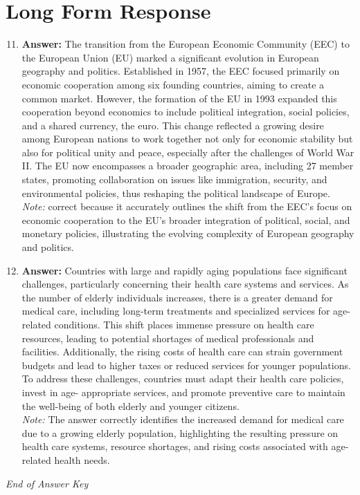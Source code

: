 \documentclass[12pt]{article}
\begin{document}
\section*{Long Form Response}
\begin{enumerate}[label=\arabic*.]
\setcounter{enumi}{10}
\item \textbf{Answer:} The transition from the European Economic Community (EEC) to the European Union (EU) marked a significant evolution in European geography and politics. Established in 1957, the EEC focused primarily on economic cooperation among six founding countries, aiming to create a common market. However, the formation of the EU in 1993 expanded this cooperation beyond economics to include political integration, social policies, and a shared currency, the euro. This change reflected a growing desire among European nations to work together not only for economic stability but also for political unity and peace, especially after the challenges of World War II. The EU now encompasses a broader geographic area, including 27 member states, promoting collaboration on issues like immigration, security, and environmental policies, thus reshaping the political landscape of Europe.
\\ \textit{Note:} correct because it accurately outlines the shift from the EEC's focus on economic cooperation to the EU's broader integration of political, social, and monetary policies, illustrating the evolving complexity of European geography and politics.
\item \textbf{Answer:} Countries with large and rapidly aging populations face significant challenges, particularly concerning their health care systems and services. As the number of elderly individuals increases, there is a greater demand for medical care, including long-term treatments and specialized services for age-related conditions. This shift places immense pressure on health care resources, leading to potential shortages of medical professionals and facilities. Additionally, the rising costs of health care can strain government budgets and lead to higher taxes or reduced services for younger populations. To address these challenges, countries must adapt their health care policies, invest in age- appropriate services, and promote preventive care to maintain the well-being of both elderly and younger citizens.
\\ \textit{Note:} The answer correctly identifies the increased demand for medical care due to a growing elderly population, highlighting the resulting pressure on health care systems, resource shortages, and rising costs associated with age-related health needs.
\end{enumerate}

\vfill
\noindent\textit{End of Answer Key}
\end{document}
